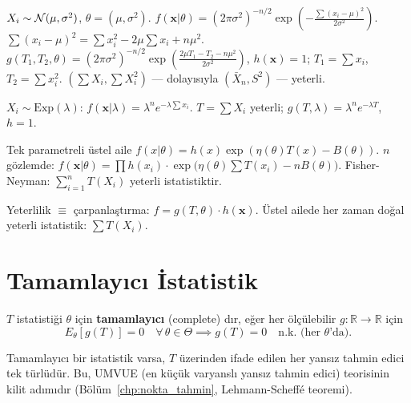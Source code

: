 \begin{ornek}
$X_i \sim \mathcal{N}(\mu, \sigma^2)$, $\theta = (\mu, \sigma^2)$.
$f(\mathbf{x}|\theta) = (2\pi\sigma^2)^{-n/2}\exp\!\left(-\frac{\sum(x_i-\mu)^2}{2\sigma^2}\right)$.
$\sum(x_i-\mu)^2 = \sum x_i^2 - 2\mu\sum x_i + n\mu^2$.
$g(T_1,T_2,\theta) = (2\pi\sigma^2)^{-n/2}\exp\!\left(\frac{2\mu T_1 - T_2 - n\mu^2}{2\sigma^2}\right)$,
$h(\mathbf{x})=1$; $T_1 = \sum x_i$, $T_2 = \sum x_i^2$.
$(\sum X_i, \sum X_i^2)$ --- dolayısıyla $(\bar{X}_n, S^2)$ --- yeterli.
\end{ornek}

\begin{ornek}
$X_i \sim \mathrm{Exp}(\lambda)$: $f(\mathbf{x}|\lambda) = \lambda^n e^{-\lambda\sum x_i}$.
$T = \sum X_i$ yeterli; $g(T,\lambda) = \lambda^n e^{-\lambda T}$, $h = 1$.
\end{ornek}

\begin{teorem}
\label{thm:ustel_yeterli}
Tek parametreli üstel aile $f(x|\theta) = h(x)\exp(\eta(\theta)T(x) - B(\theta))$.
$n$ gözlemde: $f(\mathbf{x}|\theta) = \prod h(x_i) \cdot \exp\!\bigl(\eta(\theta)\sum T(x_i) - nB(\theta)\bigr)$.
Fisher-Neyman: $\sum_{i=1}^n T(X_i)$ yeterli istatistiktir.
\end{teorem}

\begin{mikroozet}
Yeterlilik $\equiv$ çarpanlaştırma: $f = g(T,\theta)\cdot h(\mathbf{x})$.
Üstel ailede her zaman doğal yeterli istatistik: $\sum T(X_i)$.
\end{mikroozet}

\section{Tamamlayıcı İstatistik}
\label{sec:tamamlayici}

\begin{tanim}
\label{def:tamamlayici}
$T$ istatistiği $\theta$ için \textbf{tamamlayıcı} (complete) dır, eğer
her ölçülebilir $g : \mathbb{R} \to \mathbb{R}$ için
\[
  E_\theta[g(T)] = 0 \quad \forall\,\theta \in \Theta \implies g(T) = 0 \quad \text{n.k.\ (her } \theta\text{'da)}.
\]
\end{tanim}

\begin{onerme}
Tamamlayıcı bir istatistik varsa, $T$ üzerinden ifade edilen her yansız tahmin edici tek türlüdür.
Bu, UMVUE (en küçük varyanslı yansız tahmin edici) teorisinin kilit adımıdır
(Bölüm~\ref{chp:nokta_tahmin}, Lehmann-Scheffé teoremi).
\end{onerme}

